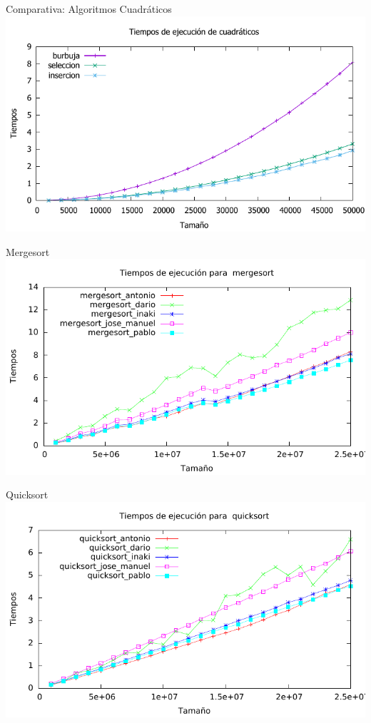 \documentclass[10pt,compress,usetitleprogressbar,mathserif]{beamer}
\begin{document}
\begin{frame}{Comparativa: Algoritmos Cuadráticos}
	\includegraphics[width = \textwidth ]{comparativa_cuadraticos_g}
\end{frame}

\begin{frame}{Mergesort}
	\includegraphics[width = \textwidth ]{mergesort_todos_g}
\end{frame}

\begin{frame}{Quicksort}
	\includegraphics[width = \textwidth ]{quicksort_todos_g}
\end{frame}
\end{document}
